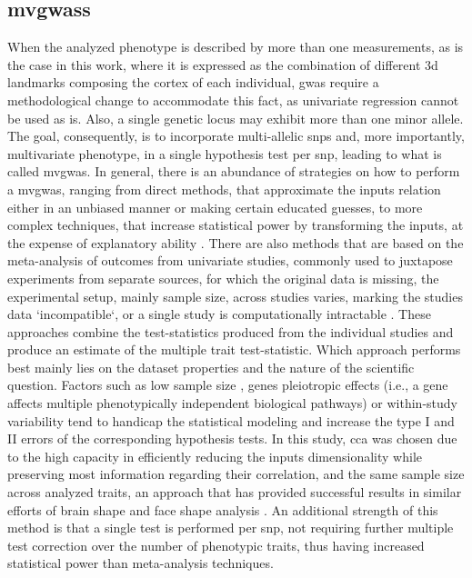 \subsection{\Acfp{mvgwas}}
When the analyzed phenotype is described by more than one measurements, as is the case in this work, where it is expressed as the combination of different \ac{3d} landmarks composing the cortex of each individual, \ac{gwas} require a methodological change to accommodate this fact, as univariate regression cannot be used as is. Also, a single genetic locus may exhibit more than one minor allele. The goal, consequently, is to incorporate multi-allelic \acsp{snp} and, more importantly, multivariate phenotype, in a single hypothesis test per \ac{snp}, leading to what is called \acf{mvgwas}. In general, there is an abundance of strategies on how to perform a \ac{mvgwas}, ranging from direct methods, that approximate the inputs relation either in an unbiased manner or making certain educated guesses, to more complex techniques, that increase statistical power by transforming the inputs, at the expense of explanatory ability \cite{Galesloot2014}. There are also methods that are based on the meta-analysis of outcomes from univariate studies, commonly used to juxtapose experiments from separate sources, for which the original data is missing, the experimental setup, mainly sample size, across studies varies, marking the studies data `incompatible`, or a single study is computationally intractable \cite{Uffelmann2021,Cichonska2016}. These approaches combine the test-statistics produced from the individual studies and produce an estimate of the multiple trait test-statistic. Which approach performs best mainly lies on the dataset properties and the nature of the scientific question. Factors such as low sample size \cite{Sheng2021}, genes pleiotropic effects \cite{Fernandes2021} (i.e., a gene affects multiple phenotypically independent biological pathways) or within-study variability \cite{Usui2021,Jackson2011} tend to handicap the statistical modeling and increase the type I and II errors of the corresponding hypothesis tests. In this study, \ac{cca} was chosen due to the high capacity in efficiently reducing the inputs dimensionality while preserving most information regarding their correlation, and the same sample size across analyzed traits, an approach that has provided successful results in similar efforts of brain shape and face shape analysis \cite{Claes2018,Naqvi2021}. An additional strength of this method is that a single test is performed per \ac{snp}, not requiring further multiple test correction over the number of phenotypic traits, thus having increased statistical power than meta-analysis techniques.



